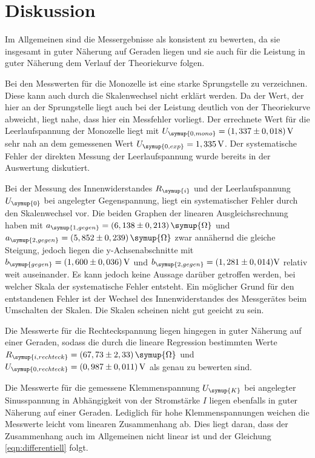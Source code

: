 \section{Diskussion}
\label{sec:Diskussion}

Im Allgemeinen sind die Messergebnisse als konsistent zu bewerten, da sie
insgesamt in guter Näherung auf Geraden liegen und sie auch für die
Leistung in guter Näherung dem Verlauf der Theoriekurve folgen.

Bei den Messwerten für die Monozelle ist eine starke Sprungstelle zu verzeichnen.
Diese kann auch durch die Skalenwechsel nicht erklärt werden. Da der Wert, der
hier an der Sprungstelle liegt auch bei der Leistung deutlich von der
Theoriekurve abweicht, liegt nahe, dass hier ein Messfehler vorliegt. Der errechnete
Wert für die Leerlaufspannung der Monozelle liegt mit
$U_{\symup{0,mono}}=(1,337\pm0,018)\,\text{V}$ sehr nah an dem gemessenen
Wert $U_{\symup{0,exp}}=1,335\,\text{V}$. Der systematische Fehler der direkten
Messung der Leerlaufspannung wurde bereits in der Auswertung diskutiert.

Bei der Messung des Innenwiderstandes $R_{\symup{i}}$ und der Leerlaufspannung
$U_{\symup{0}}$ bei angelegter Gegenspannung, liegt ein systematischer Fehler durch
den Skalenwechsel vor. Die beiden Graphen der linearen Ausgleichsrechnung haben mit
$a_{\symup{1,gegen}}=(6,138\pm0,213)\,\symup{\Omega}$ und
$a_{\symup{2,gegen}}=(5,852\pm0,239)\,\symup{\Omega}$ zwar annähernd
die gleiche Steigung, jedoch liegen die y-Achsenabschnitte mit
$b_{\symup{gegen}}=(1,600\pm0,036)\,\text{V}$ und
$b_{\symup{2,gegen}}=(1,281\pm0,014)\text{V}$
relativ weit auseinander. Es kann jedoch keine Aussage darüber getroffen werden,
bei welcher Skala der systematische Fehler entsteht. Ein möglicher Grund für den
entstandenen Fehler ist der Wechsel des Innenwiderstandes des Messgerätes beim
Umschalten der Skalen. Die Skalen scheinen nicht gut geeicht zu sein.

Die Messwerte für die Rechteckspannung liegen hingegen in guter Näherung auf einer Geraden,
sodass die durch die lineare Regression bestimmten Werte
$R_{\symup{i,rechteck}}=(67,73\pm2,33)\,\symup{\Omega}$ und
$U_{\symup{0,rechteck}}=(0,987\pm0,011)\,\text{V}$ als genau zu bewerten sind.

Die Messwerte für die gemessene Klemmenspannung $U_{\symup{K}}$ bei angelegter
Sinusspannung in Abhängigkeit von der Stromstärke $I$ liegen ebenfalls in guter Näherung auf
einer Geraden. Lediglich für hohe Klemmenspannungen weichen die Messwerte leicht
vom linearen Zusammenhang ab. Dies liegt daran, dass der Zusammenhang auch im Allgemeinen
nicht linear ist und der Gleichung \eqref{eqn:differentiell} folgt.

